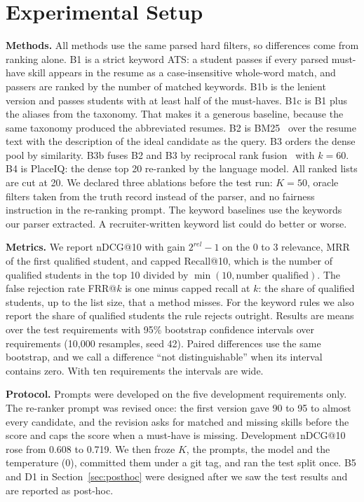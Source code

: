 \documentclass[conference]{IEEEtran}
\begin{document}
\section{Experimental Setup}
\textbf{Methods.} All methods use the same parsed hard filters, so differences come from ranking alone. B1 is a strict keyword ATS: a student passes if every parsed must-have skill appears in the resume as a case-insensitive whole-word match, and passers are ranked by the number of matched keywords. B1b is the lenient version and passes students with at least half of the must-haves. B1c is B1 plus the aliases from the taxonomy. That makes it a generous baseline, because the same taxonomy produced the abbreviated resumes. B2 is BM25~\cite{robertson2009bm25} over the resume text with the description of the ideal candidate as the query. B3 orders the dense pool by similarity. B3b fuses B2 and B3 by reciprocal rank fusion~\cite{cormack2009rrf} with $k=60$. B4 is PlaceIQ: the dense top 20 re-ranked by the language model. All ranked lists are cut at 20. We declared three ablations before the test run: $K=50$, oracle filters taken from the truth record instead of the parser, and no fairness instruction in the re-ranking prompt. The keyword baselines use the keywords our parser extracted. A recruiter-written keyword list could do better or worse.

\textbf{Metrics.} We report nDCG@10 with gain $2^{rel}-1$ on the 0 to 3 relevance, MRR of the first qualified student, and capped Recall@10, which is the number of qualified students in the top 10 divided by $\min(10,\text{number qualified})$. The false rejection rate FRR@$k$ is one minus capped recall at $k$: the share of qualified students, up to the list size, that a method misses. For the keyword rules we also report the share of qualified students the rule rejects outright. Results are means over the \NTest{} test requirements with 95\% bootstrap confidence intervals over requirements (10,000 resamples, seed 42). Paired differences use the same bootstrap, and we call a difference ``not distinguishable'' when its interval contains zero. With ten requirements the intervals are wide.

\textbf{Protocol.} Prompts were developed on the five development requirements only. The re-ranker prompt was revised once: the first version gave 90 to 95 to almost every candidate, and the revision asks for matched and missing skills before the score and caps the score when a must-have is missing. Development nDCG@10 rose from 0.608 to 0.719. We then froze $K$, the prompts, the model and the temperature (0), committed them under a git tag, and ran the test split once. B5 and D1 in Section~\ref{sec:posthoc} were designed after we saw the test results and are reported as post-hoc.
\end{document}
